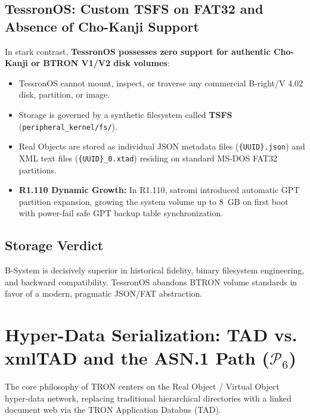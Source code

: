 \documentclass[10pt,journal,compsoc,twocolumn]{article}
\begin{document}
\subsection{TessronOS: Custom TSFS on FAT32 and Absence of Cho-Kanji Support}
In stark contrast, \textbf{TessronOS possesses zero support for authentic Cho-Kanji or BTRON V1/V2 disk volumes}:
\begin{itemize}[leftmargin=*]
    \item TessronOS cannot mount, inspect, or traverse any commercial B-right/V 4.02 disk, partition, or image.
    \item Storage is governed by a synthetic filesystem called \textbf{TSFS} (\texttt{peripheral\_kernel/fs/}).
    \item Real Objects are stored as individual JSON metadata files (\texttt{\{UUID\}.json}) and XML text files (\texttt{\{UUID\}\_0.xtad}) residing on standard MS-DOS FAT32 partitions.
    \item \textbf{R1.110 Dynamic Growth:} In R1.110, satromi introduced automatic GPT partition expansion, growing the system volume up to 8~GB on first boot with power-fail safe GPT backup table synchronization.
\end{itemize}

\subsection{Storage Verdict}
B-System is decisively superior in historical fidelity, binary filesystem engineering, and backward compatibility. TessronOS abandons BTRON volume standards in favor of a modern, pragmatic JSON/FAT abstraction.

\section{Hyper-Data Serialization: TAD vs. xmlTAD and the ASN.1 Path ($\mathcal{P}_6$)}
\label{sec:tad}

The core philosophy of TRON centers on the Real Object / Virtual Object hyper-data network, replacing traditional hierarchical directories with a linked document web via the TRON Application Databus (TAD).
\end{document}
